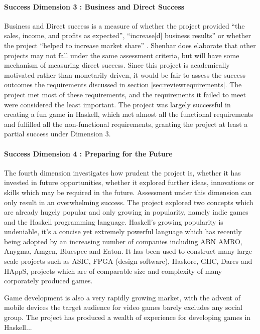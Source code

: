 \paragraph{Success Dimension 3 : Business and Direct Success}
Business and Direct success is a measure of whether the project provided ``the sales, income, and profits as expected'', ``increase[d] business results'' or whether the project ``helped to increase market share'' \cite{shenhar}. Shenhar does elaborate that other projects may not fall under the same assessment criteria, but will have some mechanism of measuring direct success. Since this project is academically motivated rather than monetarily driven, it would be fair to assess the success outcomes the requirements discussed in section \ref{sec:reviewrequirements}. The project met most of these requirements, and the requirements it failed to meet were considered the least important. The project was largely successful in creating a fun game in Haskell, which met almost all the functional requirements and fulfilled all the non-functional requirements, granting the project at least a partial success under Dimension 3.
 
\paragraph{Success Dimension 4 : Preparing for the Future}
The fourth dimension investigates how prudent the project is, whether it has invested in future opportunities, whether it explored further ideas, innovations or skills which may be required in the future. Assessment under this dimension can only result in an overwhelming success. The project explored two concepts which are already hugely popular and only growing in popularity, namely indie games and the Haskell programming language. Haskell's growing popularity is undeniable, it's a concise yet extremely powerful language which has recently being adopted by an increasing number of companies including ABN AMRO, Anygma, Amgen, Bluespec and Eaton. It has been used to construct many large scale projects such as ASIC, FPGA (design software), Haskore, GHC, Darcs and HAppS, projects which are of comparable size and complexity of many corporately produced games. \cite{realworldhaskell}

Game development is also a very rapidly growing market, with the advent of mobile devices the target audience for video games barely excludes any social group.  
The project has produced a wealth of experience for developing games in Haskell...

